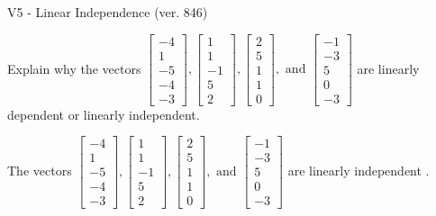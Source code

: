 \begin{exercise}
  \begin{exerciseTitle}V5 - Linear Independence (ver. 846)\end{exerciseTitle}
  \begin{exerciseStatement}
    Explain why the vectors \(\left[\begin{array}{r}
-4 \\
1 \\
-5 \\
-4 \\
-3
\end{array}\right] , \left[\begin{array}{r}
1 \\
1 \\
-1 \\
5 \\
2
\end{array}\right] , \left[\begin{array}{r}
2 \\
5 \\
1 \\
1 \\
0
\end{array}\right] , \text{ and } \left[\begin{array}{r}
-1 \\
-3 \\
5 \\
0 \\
-3
\end{array}\right]\) are linearly dependent or linearly independent.	


  \end{exerciseStatement}
  \begin{exerciseAnswer}
   The vectors \(\left[\begin{array}{r}
-4 \\
1 \\
-5 \\
-4 \\
-3
\end{array}\right] , \left[\begin{array}{r}
1 \\
1 \\
-1 \\
5 \\
2
\end{array}\right] , \left[\begin{array}{r}
2 \\
5 \\
1 \\
1 \\
0
\end{array}\right] , \text{ and } \left[\begin{array}{r}
-1 \\
-3 \\
5 \\
0 \\
-3
\end{array}\right]\) are 
  	 linearly independent  .
  


  \end{exerciseAnswer}
\end{exercise}